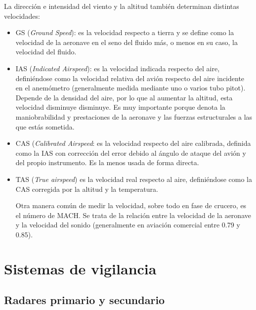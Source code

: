La dirección e intensidad del viento y la altitud también determinan distintas velocidades:

\begin{itemize}

	\item GS (\textit{Ground Speed}): es la velocidad respecto a tierra y se define como la velocidad de la aeronave en el seno del fluido más, o menos en su caso, la velocidad del fluido.

	\item IAS (\textit{Indicated Airspeed}): es la velocidad indicada respecto del aire, definiéndose como la velocidad relativa del avión respecto del aire incidente en el anemómetro (generalmente medida mediante uno o varios tubo pitot). Depende de la densidad del aire, por lo que al aumentar la altitud, esta velocidad disminuye disminuye. Es muy importante porque denota la maniobrabilidad y prestaciones de la aeronave y las fuerzas estructurales a las que estás sometida.

	\item CAS (\textit{Calibrated Airspeed}: es la velocidad respecto del aire calibrada, definida como la IAS  con corrección del error debido al ángulo de ataque del avión y del propio instrumento. Es la menos usada de forma directa.

	\item TAS (\textit{True airspeed}) es la velocidad real respecto al aire, definiéndose como la CAS corregida por la altitud y la temperatura.
	
Otra manera común de medir la velocidad, sobre todo en fase de crucero, es el número de MACH. Se trata de la relación entre la velocidad de la aeronave y la velocidad del sonido (generalmente en aviación comercial entre 0.79 y 0.85).

\end{itemize}






\clearpage

\section{Sistemas de vigilancia}
\label{sec:SistemasVigilancia}

\subsection{Radares primario y secundario}
\label{subsec:RadaresPrimarioSecundario}

